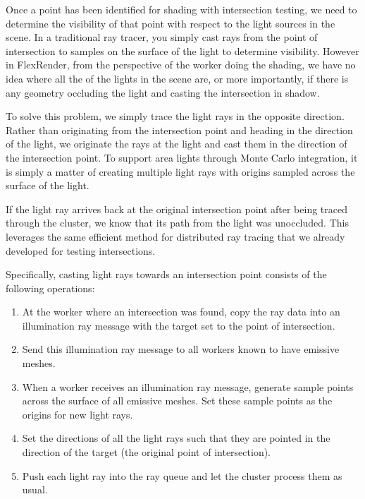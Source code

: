 \documentclass[a4paper,twoside]{article}
\begin{document}
Once a point has been identified for shading with intersection testing, we
need to determine the visibility of that point with respect to the light sources
in the scene. In a traditional ray tracer, you simply cast rays from the point
of intersection to samples on the surface of the light to determine visibility.
However in FlexRender, from the perspective of the worker doing the shading,
we have no idea where all the of the lights in the scene are, or more importantly,
if there is any geometry occluding the light and casting the intersection in
shadow.

To solve this problem, we simply trace the light rays in the opposite direction.
Rather than originating from the intersection point and heading in the
direction of the light, we originate the rays at the light and cast them in the
direction of the intersection point. To support area lights through Monte Carlo
integration, it is simply a matter of creating multiple light rays with origins
sampled across the surface of the light.

If the light ray arrives back at the original intersection point after being
traced through the cluster, we know that its path from the light was unoccluded.
This leverages the same efficient method for distributed ray tracing that we
already developed for testing intersections.

Specifically, casting light rays towards an intersection point consists of the
following operations:

\begin{enumerate}
    \item At the worker where an intersection was found, copy the ray data into
        an illumination ray message with the target set to the point of intersection.
    \item Send this illumination ray message to all workers known to have emissive meshes.
    \item When a worker receives an illumination ray message, generate sample points
        across the surface of all emissive meshes. Set these sample points as
        the origins for new light rays.
    \item Set the directions of all the light rays such that they are pointed
        in the direction of the target (the original point of intersection).
    \item Push each light ray into the ray queue and let the cluster process
        them as usual.
\end{enumerate}
\end{document}
